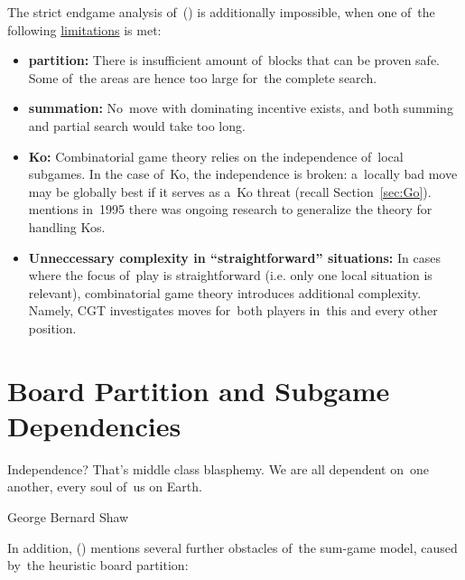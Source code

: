 The strict endgame analysis of~(\cite{Muller1995computer}) is additionally impossible, when one of~the following \underline{limitations} is met:
\begin{itemize}[-]
  \item \textbf{partition:}
    There is insufficient amount of~blocks that can be proven safe.
    Some of~the areas are hence too large for~the complete search.
  \item \textbf{summation:}
    No~move with dominating incentive exists, and both summing and partial search would take too long.
  \item \textbf{Ko:}
    Combinatorial game theory relies on the independence of~local subgames.
    In the case of~Ko, the independence is broken:
    a~locally bad move may be globally best if it serves as a~Ko threat (recall Section~\ref{sec:Go}).
    \Mueller{} mentions in~1995 there was ongoing research to generalize the theory for handling Kos.
  \item \textbf{Unneccessary complexity in ``straightforward'' situations:}
    In cases where the focus of~play is straightforward (i.e. only one local situation is relevant), combinatorial game theory introduces additional complexity.
    Namely, CGT investigates moves for~both players in~this and every other position.
\end{itemize}

\section{Board Partition and Subgame Dependencies}
\epigraph{
  Independence?
  That's middle class blasphemy.
  We are all dependent on~one another, every soul of~us on Earth. 
}{George Bernard Shaw}
In addition, (\cite{Muller1995computer}) mentions several further obstacles of~the sum-game model, caused by~the heuristic board partition:

